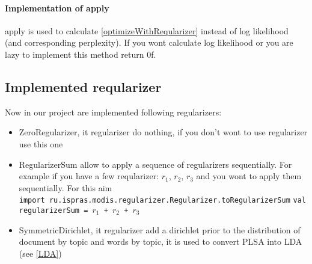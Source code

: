 \paragraph{Implementation of apply \\}
    apply is used to calculate \ref{optimizeWithReqularizer} instead of log likelihood (and corresponding perplexity). If you wont calculate log likelihood or
    you are lazy to implement this method return 0f. 

\subsection*{Implemented reqularizer}
    Now in our project are implemented following regularizers:
    \begin{itemize}
	\item ZeroRegularizer, it regularizer do nothing, if you don't wont to use regularizer use this one
	\item RegularizerSum allow to apply a sequence of regularizers sequentially. For example if you have a few reqularizer: $r_1$, $r_2$, $r_3$ and you wont to
	    apply them sequentially. For this aim\\
	    \texttt{import ru.ispras.modis.regularizer.Regularizer.toRegularizerSum}
	    \texttt{val regularizerSum = $r_1$ + $r_2$ + $r_3$}
	\item SymmetricDirichlet, it regularizer add a dirichlet prior to the distribution of document by topic and words by topic, it is used to convert PLSA into LDA (see \ref{LDA})
    \end{itemize}

	